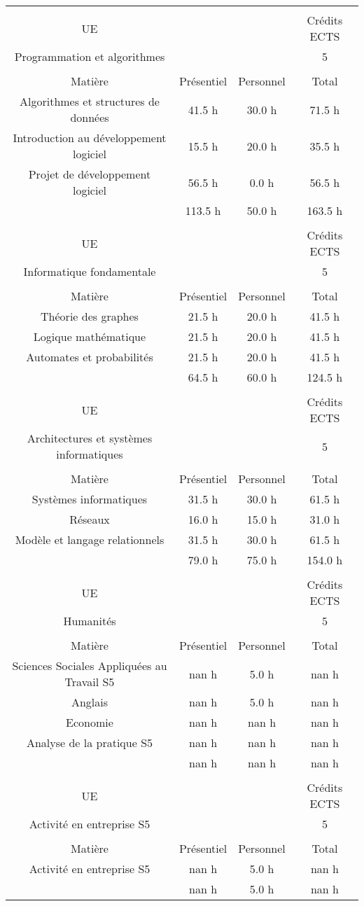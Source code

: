 \begin{longtable}{c c c c}%
&&&\\%
UE&&&Crédits ECTS\\%
Programmation et algorithmes&&&5\\%
&&&\\%
Matière&Présentiel&Personnel&Total\\%
Algorithmes et structures de données&41.5 h&30.0 h&71.5 h\\%
Introduction au développement logiciel&15.5 h&20.0 h&35.5 h\\%
Projet de développement logiciel&56.5 h&0.0 h&56.5 h\\%
\hline%
&113.5 h&50.0 h&163.5 h\\%
\hline%
&&&\\%
UE&&&Crédits ECTS\\%
Informatique fondamentale&&&5\\%
&&&\\%
Matière&Présentiel&Personnel&Total\\%
Théorie des graphes&21.5 h&20.0 h&41.5 h\\%
Logique mathématique&21.5 h&20.0 h&41.5 h\\%
Automates et probabilités&21.5 h&20.0 h&41.5 h\\%
\hline%
&64.5 h&60.0 h&124.5 h\\%
\hline%
&&&\\%
UE&&&Crédits ECTS\\%
Architectures et systèmes informatiques&&&5\\%
&&&\\%
Matière&Présentiel&Personnel&Total\\%
Systèmes informatiques&31.5 h&30.0 h&61.5 h\\%
Réseaux&16.0 h&15.0 h&31.0 h\\%
Modèle et langage relationnels&31.5 h&30.0 h&61.5 h\\%
\hline%
&79.0 h&75.0 h&154.0 h\\%
\hline%
&&&\\%
UE&&&Crédits ECTS\\%
Humanités&&&5\\%
&&&\\%
Matière&Présentiel&Personnel&Total\\%
Sciences Sociales Appliquées au Travail S5&nan h&5.0 h&nan h\\%
Anglais&nan h&5.0 h&nan h\\%
Economie&nan h&nan h&nan h\\%
Analyse de la pratique S5&nan h&nan h&nan h\\%
\hline%
&nan h&nan h&nan h\\%
\hline%
&&&\\%
UE&&&Crédits ECTS\\%
Activité en entreprise S5&&&5\\%
&&&\\%
Matière&Présentiel&Personnel&Total\\%
Activité en entreprise S5&nan h&5.0 h&nan h\\%
\hline%
&nan h&5.0 h&nan h\\%
\hline%
\end{longtable}